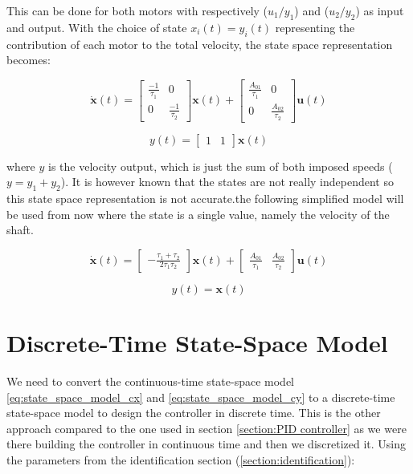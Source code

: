 This can be done for both motors with respectively ($u_1/y_1$) and ($u_2/y_2$) as input and output. With the choice of 
state $x_i(t) = y_i(t)$ representing the contribution of each motor to the total velocity, the state space 
representation becomes:

\begin{equation*}
    \dot{\mathbf{x}}(t) = \begin{bmatrix}
    \frac{-1}{\tau_1} & 0 \\ 
    0 & \frac{-1}{\tau_2}
    \end{bmatrix} \mathbf{x}(t) + \begin{bmatrix} 
    \frac{A_{01}}{\tau_1} & 0\\ 
    0 & \frac{A_{02}}{\tau_2} 
    \end{bmatrix}\mathbf{u}(t)
\end{equation*}

\begin{equation}
    y(t) = \begin{bmatrix} 1 & 1 \end{bmatrix}\mathbf{x}(t)
\end{equation}

where \( y \) is the velocity output, which is just the sum of both imposed speeds ($y = y_1 + y_2$). It is however 
known that the states are not really independent so this state space representation is not accurate.the following 
simplified model will be used from now where the state is a single value, namely the velocity of the shaft.

\begin{equation}
    \dot{\mathbf{x}}(t) = \begin{bmatrix}-\frac{\tau_1+\tau_2}{2 \tau_1 \tau_2}\end{bmatrix} \mathbf{x}(t) + 
    \begin{bmatrix} 
     \frac{A_{01}}{\tau_1} & \frac{A_{02}}{\tau_2} 
    \end{bmatrix}\mathbf{u}(t)
    \label{eq:state_space_model_cx}
\end{equation}

\begin{equation}
    y(t) = \mathbf{x}(t)
    \label{eq:state_space_model_cy}
\end{equation}

\section{Discrete-Time State-Space Model}
We need to convert the continuous-time state-space model \eqref{eq:state_space_model_cx} and 
\eqref{eq:state_space_model_cy} to a discrete-time state-space model to design the controller in discrete time. This is
the other approach compared to the one used in section \ref{section:PID controller} as we were there building the 
controller in continuous time and then we discretized it. Using the parameters from the identification 
section (\ref{section:identification}):

